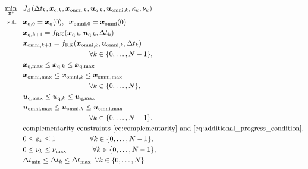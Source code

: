 \documentclass[conference,preprint]{IEEEtran}
\begin{document}
\begin{equation}
  \label{eq:final_optimization}
  \begin{aligned}
    \min_{\bm{x}^*} \hspace{3mm} & J_\text{d} \left(\Delta t_k, \bm{x}_{\text{q},k}, \bm{x}_{\text{omni},k}, \bm{u}_{\text{q},k}, \bm{u}_{\text{omni},k}, \kappa_k, \nu_{k} \right) 
    \\
    \text{s.t.} \hspace{3mm} & \bm{x}_{\text{q},0} = \bm{x}_{\text{q}}(0), \hspace{2mm} \bm{x}_{\text{omni},0} = \bm{x}_{\text{omni}}(0)
    \\
    & \bm{x}_{\text{q},k+1} = f_\text{RK}(\bm{x}_{\text{q},k}, \bm{u}_{\text{q},k}, \Delta t_k)
    \\
    & \bm{x}_{\text{omni},k+1} = f_\text{RK}(\bm{x}_{\text{omni},k}, \bm{u}_{\text{omni},k}, \Delta t_k)
    \\ 
    & \hspace{33mm} \forall  k\in \{0, \ldots, N-1\},
    \\
    & \bm{x}_{\text{q},\text{max}} \leq \bm{x}_{\text{q},k} \leq \bm{x}_{\text{q},\text{max}}
    \\
    & \bm{x}_{\text{omni},\text{max}} \leq \bm{x}_{\text{omni},k} \leq \bm{x}_{\text{omni},\text{max}}
    \\
    & \hspace{33mm} \forall  k\in \{0, \ldots, N\},
    \\
    & \bm{u}_{\text{q},\text{max}} \leq \bm{u}_{\text{q},k} \leq \bm{u}_{\text{q},\text{max}}
    \\
    & \bm{u}_{\text{omni},\text{max}} \leq \bm{u}_{\text{omni},k} \leq \bm{u}_{\text{omni},\text{max}}
    \\
    &  \hspace{33mm} \forall  k\in \{0, \ldots, N-1\},
    \\
    & \text{complementarity constraints~\eqref{eq:complementarity} and~\eqref{eq:additional_progress_condition}},
    \\
    & 0 \leq \varepsilon_{k} \leq 1 \hspace{17mm} \forall  k\in \{0, \ldots, N-1\}, 
    \\
    & 0 \leq \nu_{k} \leq \nu_\text{max} \hspace{13mm} \forall  k\in \{0, \ldots, N-1\}, 
    \\
    & \Delta t_\text{min} \leq \Delta t_k \leq \Delta t_\text{max} \hspace{2mm} \forall  k\in \{0, \ldots, N\}
  \end{aligned}
\end{equation}
\end{document}
